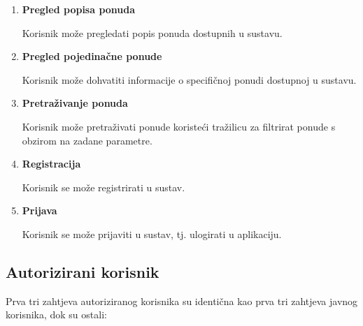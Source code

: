 \documentclass[times, utf8, zavrsni, numeric]{fer}
\newcommand{\razmaks}{\vspace{10pt}}
\newcommand{\uvlakas}{\hspace{0.5cm}}
\begin{document}
\razmaks
\begin{enumerate} 
  \item \textbf{Pregled popisa ponuda} \par
    \uvlakas Korisnik može pregledati popis ponuda dostupnih u sustavu.

  \item \textbf{Pregled pojedinačne ponude} \par
    \uvlakas Korisnik može dohvatiti informacije o specifičnoj ponudi dostupnoj u sustavu.

  \item \textbf{Pretraživanje ponuda} \par
    \uvlakas Korisnik može pretraživati ponude koristeći tražilicu za filtrirat ponude s obzirom na zadane parametre.

  \item \textbf{Registracija} \par
    \uvlakas Korisnik se može registrirati  u sustav.

  \item \textbf{Prijava} \par
    \uvlakas Korisnik se može prijaviti u sustav, tj. ulogirati  u aplikaciju.

\end{enumerate}
\razmaks


\subsection{Autorizirani korisnik}

Prva tri zahtjeva autoriziranog korisnika su identična kao prva tri zahtjeva javnog korisnika, dok su ostali:
\end{document}

